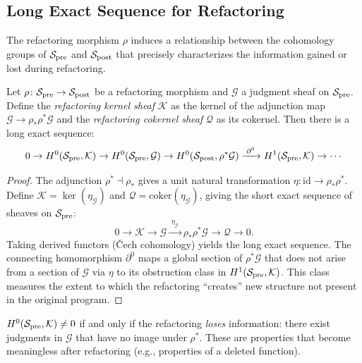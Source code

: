 \documentclass[11pt]{article}
\newcommand{\SitePre}{\Site_{\mathrm{pre}}}
\newcommand{\SitePost}{\Site_{\mathrm{post}}}
\newcommand{\RefactorMorph}{\rho}
\newcommand{\id}{\mathrm{id}}                       %
\newcommand{\coker}{\mathrm{coker}}                 %
\begin{document}
\subsection{Long Exact Sequence for Refactoring}\label{ssec:long-exact}

The refactoring morphism $\RefactorMorph$ induces a relationship between
the cohomology groups of $\SitePre$ and $\SitePost$ that precisely
characterizes the information gained or lost during refactoring.

\begin{theorem}\label{thm:long-exact}
Let $\RefactorMorph \colon \SitePre \to \SitePost$ be a refactoring
morphism and $\mathcal{G}$ a judgment sheaf on $\SitePre$.  Define the
\emph{refactoring kernel sheaf} $\mathcal{K}$ as the kernel of the
adjunction map $\mathcal{G} \to \RefactorMorph_*\RefactorMorph^*
\mathcal{G}$ and the \emph{refactoring cokernel sheaf} $\mathcal{Q}$ as
its cokernel.  Then there is a long exact sequence:
\[
  0 \to \Hcoh{0}(\SitePre, \mathcal{K})
    \to \Hcoh{0}(\SitePre, \mathcal{G})
    \to \Hcoh{0}(\SitePost, \RefactorMorph^*\mathcal{G})
    \xrightarrow{\;\partial^0\;}
    \Hcoh{1}(\SitePre, \mathcal{K})
    \to \cdots
\]
\end{theorem}

\begin{proof}
The adjunction $\RefactorMorph^* \dashv \RefactorMorph_*$ gives a
unit natural transformation
$\eta \colon \id \to \RefactorMorph_*\RefactorMorph^*$.  Define
$\mathcal{K} = \ker(\eta_{\mathcal{G}})$ and
$\mathcal{Q} = \coker(\eta_{\mathcal{G}})$, giving the short exact
sequence of sheaves on $\SitePre$:
\[
  0 \to \mathcal{K} \to \mathcal{G}
    \xrightarrow{\;\eta_{\mathcal{G}}\;}
    \RefactorMorph_*\RefactorMorph^*\mathcal{G}
    \to \mathcal{Q} \to 0.
\]
Taking derived functors (Čech cohomology) yields the long exact
sequence.  The connecting homomorphism $\partial^0$ maps a global
section of $\RefactorMorph^*\mathcal{G}$ that does not arise from a
section of $\mathcal{G}$ via $\eta$ to its obstruction class in
$\Hcoh{1}(\SitePre, \mathcal{K})$.  This class measures the extent
to which the refactoring ``creates'' new structure not present in the
original program.
\end{proof}

\begin{corollary}\label{cor:kernel-interp}
$\Hcoh{0}(\SitePre, \mathcal{K}) \neq 0$ if and only if the
refactoring \emph{loses} information: there exist judgments in
$\mathcal{G}$ that have no image under $\RefactorMorph^*$.  These
are properties that become meaningless after refactoring (e.g.,
properties of a deleted function).
\end{corollary}
\end{document}
